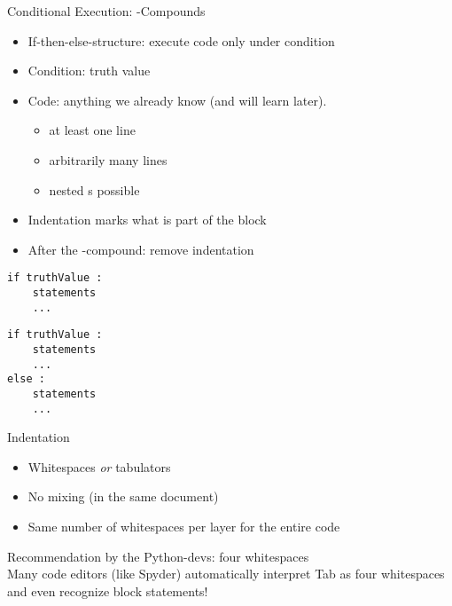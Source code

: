 \begin{frame}[fragile]{Conditional Execution: -Compounds}
%
\begin{minipage}[t]{.49\linewidth}
\begin{itemize}
\item If-then-else-structure: execute code only under condition
\item Condition: truth value
\item Code: anything we already know (and will learn later).
	\begin{itemize}
	\item at least one line
	\item arbitrarily many lines
	\item nested s possible
	\end{itemize}
\item Indentation marks what is part of the block
\item After the -compound: remove indentation
\end{itemize}
\end{minipage}
%
\begin{minipage}[t]{.03\linewidth}
\phantom{x}
\end{minipage}
%
\begin{minipage}[t]{.45\linewidth}
\vspace{-3pt}
\begin{codebox}
\begin{verbatim}
if truthValue :
    statements
    ...
\end{verbatim}
\end{codebox}
%
\begin{codebox}
\begin{verbatim}
if truthValue :
    statements
    ...
else :
    statements
    ...
\end{verbatim}
\end{codebox}
\end{minipage}
%
\end{frame}


\begin{frame}{Indentation}
%
\begin{itemize}
\item Whitespaces \emph{or} tabulators
\item No mixing (in the same document)
\item Same number of whitespaces per layer for the entire code
\end{itemize}
%
\begin{hintbox}
Recommendation by the Python-devs: four whitespaces\\
Many code editors (like Spyder) automatically interpret Tab as four whitespaces and even recognize block statements!
\end{hintbox}
%
\end{frame}

